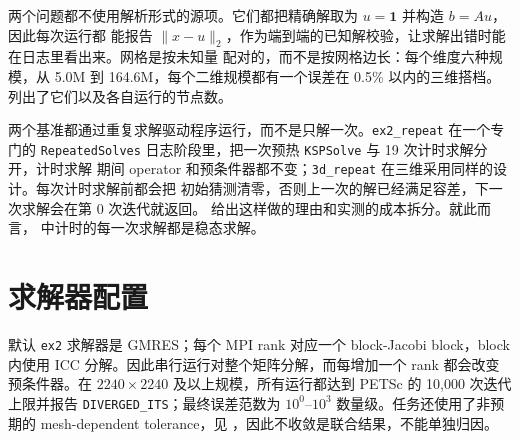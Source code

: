 \documentclass[11pt,a4paper,oneside]{report}
\begin{document}
两个问题都不使用解析形式的源项。它们都把精确解取为 $u=\mathbf{1}$ 并构造 $b=Au$，因此每次运行都
能报告 $\lVert x-u\rVert_2$，作为端到端的已知解校验，让求解出错时能在日志里看出来。网格是按未知量
配对的，而不是按网格边长：每个维度六种规模，从 5.0M 到 164.6M，每个二维规模都有一个误差在 0.5\%
以内的三维搭档。 列出了它们以及各自运行的节点数。

两个基准都通过重复求解驱动程序运行，而不是只解一次。\texttt{ex2\_repeat} 在一个专门的
\texttt{RepeatedSolves} 日志阶段里，把一次预热 \texttt{KSPSolve} 与 19 次计时求解分开，计时求解
期间 operator 和预条件器都不变；\texttt{3d\_repeat} 在三维采用同样的设计。每次计时求解前都会把
初始猜测清零，否则上一次的解已经满足容差，下一次求解会在第 0 次迭代就返回。
给出这样做的理由和实测的成本拆分。就此而言， 中计时的每一次求解都是稳态求解。

\section{求解器配置}
\label{sec:solver}
默认 \texttt{ex2} 求解器是 GMRES；每个 MPI rank 对应一个 block-Jacobi block，block 内使用
ICC 分解。因此串行运行对整个矩阵分解，而每增加一个 rank 都会改变预条件器。在
$2240\times2240$ 及以上规模，所有运行都达到 PETSc 的 10,000 次迭代上限并报告
\texttt{DIVERGED\_ITS}；最终误差范数为 $10^0$--$10^3$ 数量级。任务还使用了非预期的
mesh-dependent tolerance，见 ，因此不收敛是联合结果，不能单独归因。
\end{document}
